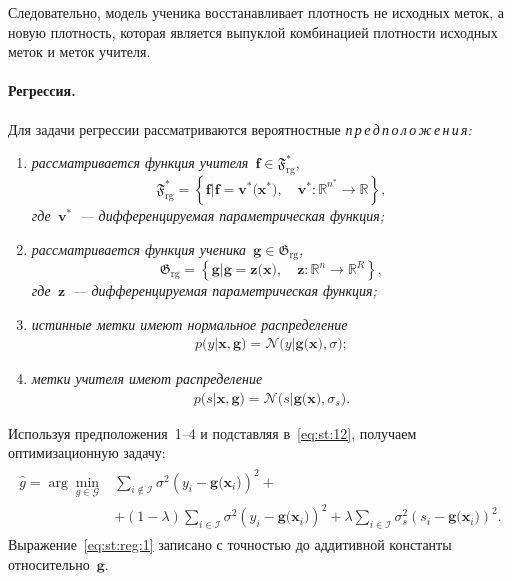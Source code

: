 Следовательно, модель ученика восстанавливает плотность не исходных меток, а новую плотность, которая является выпуклой комбинацией плотности исходных меток и меток учителя.

\paragraph{Регрессия.} Для задачи регрессии рассматриваются вероятностные \emph{п\,р\,е\,д\,п\,о\,л\,о\,ж\,е\,н\,и\,я:}

\begin{enumerate}[1)]
	\item \emph{рассматривается функция учителя~$\mathbf{f}\in\mathfrak{F}_{\text{rg}}^{*}$,
	\[
	\mathfrak{F}_{\text{rg}}^* = \left\{\mathbf{f}| \mathbf{f} = \mathbf{v}^*\bigr(\mathbf{x}^*\bigr), \quad \mathbf{v}^*: \mathbb{R}^{n^*} \to \mathbb{R} \right\},
	\]
	где~$\mathbf{v}^*$~--- дифференцируемая параметрическая функция;}
	\item \emph{рассматривается функция ученика~$\mathbf{g}\in\mathfrak{G}_{\text{rg}}$,
    \[
    \mathfrak{G}_{\text{rg}} = \left\{\mathbf{g}| \mathbf{g} = \mathbf{z}\bigr(\mathbf{x}\bigr), \quad \mathbf{z}: \mathbb{R}^n \to \mathbb{R}^R \right\},
    \]
    где~$\mathbf{z}$~--- дифференцируемая параметрическая функция;}
	\item \emph{истинные метки имеют нормальное распределение
	\begin{gather}
		p\bigr(y|\mathbf{x}, \mathbf{g}\bigr) = \mathcal{N}\bigr(y|\mathbf{g}\bigr(\mathbf{x}\bigr), \sigma\bigr);
	\end{gather}}
	\item \emph{метки учителя имеют распределение
	\begin{gather}
		p\bigr(s| \mathbf{x}, \mathbf{g}\bigr) = \mathcal{N}\bigr(s|\mathbf{g}\bigr(\mathbf{x}\bigr), \sigma_s\bigr).
	\end{gather}}
\end{enumerate}
Используя предположения~1--4 и подставляя в~\eqref{eq:st:12}, получаем оптимизационную задачу:
\begin{gather}
\label{eq:st:reg:1}
\begin{aligned}
\hat{g} = \arg\min_{g\in \mathcal{G}} & \sum_{i\not\in \mathcal{I}}\sigma^2\left(y_i-\mathbf{g}\bigr(\mathbf{x}_i\bigr)\right)^2 +\\
&+ \left(1-\lambda\right)\sum_{i\in \mathcal{I}}\sigma^2\left(y_i-\mathbf{g}\bigr(\mathbf{x}_i\bigr)\right)^2 + \lambda\sum_{i\in \mathcal{I}}\sigma_s^2\left(s_i-\mathbf{g}\bigr(\mathbf{x}_i\bigr)\right)^2.
\end{aligned}
\end{gather}
Выражение~\eqref{eq:st:reg:1} записано с точностью до аддитивной константы относительно~$\mathbf{g}$. 

